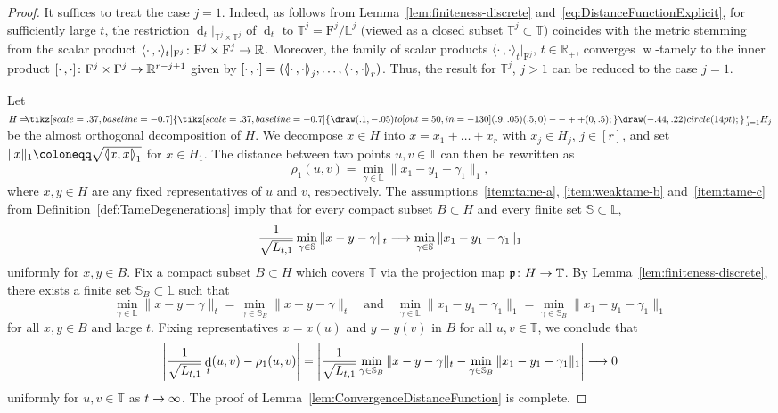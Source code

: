 \documentclass[AHL,Unicode,longabstracts]{cedram}
\newcommand{\symbuptm}{\tikz[scale=.37, baseline=-0.7]{\draw(.1,-.05)to[out=50,in=-130](.9,.05) (.5,0)--++(0,.5);}}
\newcommand{\almorth}{\tikz[scale=.37, baseline=-0.7]{\symbuptm \draw (-.44,.22) circle (14pt);}}
\newcommand{\aplus}{\hspace{-.2cm}\almorth\,}
\newcommand{\innone}[2]{{\langle#2\rangle_{#1}}}
\newcommand{\llangle}{\mathopen{\langle\mkern -3.1mu\lvert}}
\newcommand{\rrangle}{\mathclose{\rvert\mkern -3.1mu\rangle}}
\newcommand{\highinn}[2]{{\llangle#2\rrangle_{#1}}}
\newcommand{\norm}[1]{\|#1\|}
\newcommand{\rest}[1]{\vert_{#1}}
\DeclareMathOperator{\weak}{w}
\DeclareMathOperator{\dist}{d}
\newcommand{\filter}{\mathrm{F}}
\newcommand{\R}{\mathbb{R}}
\newcommand{\T}{\mathbb{T}}
\renewcommand{\L}{\mathbb{L}}
\renewcommand{\S}{\mathbb{S}}
\newcommand{\proj}{\mathfrak{p}}
\renewcommand*{\to}{\mathchoice{\longrightarrow}{\rightarrow}{\rightarrow}{\rightarrow}}
\begin{document}
\begin{proof}
It suffices to treat the case $j=1$. Indeed, as follows from Lemma~\ref{lem:finiteness-discrete} and~\eqref{eq:DistanceFunctionExplicit}, for sufficiently large $t$, the restriction $\dist_t \rest{\T^j\times \T^j}$ of $\dist_t$ to $\T^j = \filter^j / \L^j$ (viewed as a closed subset $\T^j \subset\T$) coincides with the metric stemming from the scalar product $\innone{t}{\cdot\,, \cdot} \rest{\filter^j} \colon \filter^j \times \filter^j \to \R$. Moreover, the family of scalar products $\innone{t}{\cdot\,, \cdot} \rest{\filter^j}$, $t \in \R_+$, converges $\weak$-tamely to the inner product $[\cdot \,, \cdot] \colon \filter^j \times\filter^j \to \R^{r-j+1}$ given by $[\cdot \,, \cdot] = (\highinn{j}{\cdot\,,\cdot}, \dots, \highinn{r}{\cdot\,,\cdot})$. Thus, the result for $\T^j$, $j >1$ can be reduced to the case $j=1$.

\pagebreak
Let $H = \aplus_{j=1}^r H_j$ be the almost orthogonal decomposition of $H$. We decompose $x \in H$ into $x= x_1 + \dots + x_r$ with $x_j \in H_j$, $j \in [r]$, and set $\norm{x}_1 \coloneqq \sqrt{\highinn{1}{x,x}}$ for $x \in H_1$. The distance between two points $u,v \in \T$ can then be rewritten as
\[
\rho_1(u, v) = \min_{\gamma \in \L} \norm{x_1 - y_1 - \gamma_1}_1,
\]
where $x, y \in H$ are any fixed representatives of $u$ and $v$, respectively. The assumptions~\eqref{item:tame-a}, \eqref{item:weaktame-b} and~\eqref{item:tame-c} from Definition~\ref{def:TameDegenerations} imply that for every compact subset $B \subset H$ and every finite set $\S \subset \L$,
\[
\frac{1}{\sqrt{L_{t,1}}} \min_{\gamma\in \S} \norm{x - y - \gamma}_t \to \min_{\gamma \in \S} \norm{x_1 - y_1 - \gamma_1}_1
\]
uniformly for $x,y\in B$. Fix a compact subset $B \subset H$ which covers $\T$ via the projection map $\proj \colon H \to \T$. By Lemma~\ref{lem:finiteness-discrete}, there exists a finite set $\S_B \subset \L$ such that
\[
\min_{\gamma \in \L} \norm{x - y - \gamma}_t = \min_{\gamma \in \S_B} \norm{x - y -\gamma}_t \quad \text{and} \quad \min_{\gamma \in \L} \norm{x_1 -y_1 - \gamma_1}_1 = \min_{\gamma \in \S_B} \norm{x_1 - y_1 -\gamma_1}_1
\]
for all $x,y \in B$ and large $t$. Fixing representatives $x= x(u)$ and $y = y(v)$ in $B$ for all $u, v \in \T$, we conclude that
\[
\left| \frac{1}{\sqrt{L_{t,1}}} \dist_t(u,v) - \rho_1(u,v)\right| = \left| \frac{1}{\sqrt{L_{t,1}}} \min_{\gamma \in \S_B} \norm{x - y -\gamma}_t - \min_{\gamma \in \S_B} \norm{x_1 - y_1 -\gamma_1}_1\right| \to 0
\]
uniformly for $u,v \in \T$ as $t \to \infty$. The proof of Lemma~\ref{lem:ConvergenceDistanceFunction} is complete.
\end{proof}
\end{document}
